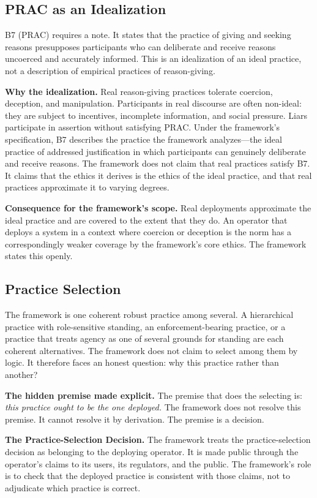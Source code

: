 \documentclass[11pt]{article}
\begin{document}
\subsection{PRAC as an Idealization}
B7 (PRAC) requires a note. It states that the practice of giving and seeking reasons presupposes participants who can deliberate and receive reasons uncoerced and accurately informed. This is an idealization of an ideal practice, not a description of empirical practices of reason-giving.

\textbf{Why the idealization.} Real reason-giving practices tolerate coercion, deception, and manipulation. Participants in real discourse are often non-ideal: they are subject to incentives, incomplete information, and social pressure. Liars participate in assertion without satisfying PRAC. Under the framework's specification, B7 describes the practice the framework analyzes---the ideal practice of addressed justification in which participants can genuinely deliberate and receive reasons. The framework does not claim that real practices satisfy B7. It claims that the ethics it derives is the ethics of the ideal practice, and that real practices approximate it to varying degrees.

\textbf{Consequence for the framework's scope.} Real deployments approximate the ideal practice and are covered to the extent that they do. An operator that deploys a system in a context where coercion or deception is the norm has a correspondingly weaker coverage by the framework's core ethics. The framework states this openly.

\subsection{Practice Selection}\label{sec:selection}
The framework is one coherent robust practice among several. A hierarchical practice with role-sensitive standing, an enforcement-bearing practice, or a practice that treats agency as one of several grounds for standing are each coherent alternatives. The framework does not claim to select among them by logic. It therefore faces an honest question: why this practice rather than another?

\textbf{The hidden premise made explicit.} The premise that does the selecting is: \emph{this practice ought to be the one deployed.} The framework does not resolve this premise. It cannot resolve it by derivation. The premise is a decision.

\begin{paperbox}
\textbf{The Practice-Selection Decision.} The framework treats the practice-selection decision as belonging to the deploying operator. It is made public through the operator's claims to its users, its regulators, and the public. The framework's role is to check that the deployed practice is consistent with those claims, not to adjudicate which practice is correct.
\end{paperbox}
\end{document}
